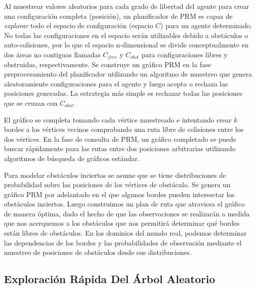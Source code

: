 Al muestrear valores aleatorios para cada grado de libertad del agente para crear una configuraci\'on completa (posici\'on), un planificador de PRM es capaz de \textit{explorar} todo el espacio de configuraci\'on (espacio $C$) para un agente determinado. No todas las configuraciones en el espacio ser\'an utilizables debido a obst\'aculos o auto-colisiones, por lo que el espacio n-dimensional se divide conceptualmente en dos \'areas no contiguas llamadas $C_{free}$ y $C_{obst}$ para configuraciones libres y obstruidas, respectivamente. Se construye un gr\'afico PRM en la fase preprocesamiento del planificador utilizando un algoritmo de muestreo que genera aleatoramiente configuraciones para el agente y luego acepta o rechaza las posiciones generadas. La estrategia m\'as simple es rechazar todas las posiciones que se cruzan con $C_{obst}$. 

El gr\'afico se completa tomando cada v\'ertice muestreado e intentando crear $k$ bordes a los v\'ertices vecinos comprobando una ruta libre de colisiones entre los dos v\'ertices. En la fase de consulta de PRM, un gr\'afico completado se puede buscar r\'apidamente para las rutas entre dos posiciones arbitrarias utilizando algoritmos de b\'usqueda de gr\'aficos est\'andar.

Para modelar obst\'aculos inciertos se asume que se tiene distribuciones de probabilidad sobre las posiciones de los v\'ertices de obst\'aculo. Se genera un gr\'afico PRM por adelantado en el que algunos bordes pueden intersectar los obst\'aculos inciertos. Luego construimos un plan de ruta que atraviesa el gr\'afico de manera \'optima, dado el hecho de que las observaciones se realizar\'an a medida que nos acerquemos a los obst\'aculos que nos permitir\'a determinar qu\'e bordes est\'an libres de obst\'aculos. En los dominios del mundo real, podemos determinar las dependencias de los bordes y las probabilidades de observaci\'on mediante el muestreo de posiciones de obst\'aculos desde sus distribuciones.

\subsection{Exploraci\'on R\'apida Del \'Arbol Aleatorio}



